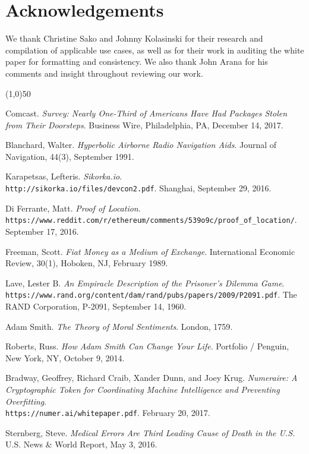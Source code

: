 \documentclass{article}
\begin{document}
\section {Acknowledgements}

We thank Christine Sako and Johnny Kolasinski for their research and compilation of applicable use cases, as well as for their work in auditing the white paper for formatting and consistency. We also thank John Arana for his comments and insight throughout reviewing our work.

\begin{center}
\line(1,0){50}
\end{center}



\begin{thebibliography}{9}

Comcast.
\textit{Survey: Nearly One-Third of Americans Have Had Packages Stolen from Their Doorsteps}.
Business Wire, Philadelphia, PA, December 14, 2017.

Blanchard, Walter.
\textit{Hyperbolic Airborne Radio Navigation Aids}.
Journal of Navigation, 44(3), September 1991.

Karapetsas, Lefteris.
\textit{Sikorka.io}.
\\\texttt{http://sikorka.io/files/devcon2.pdf}.
Shanghai, September 29, 2016.

Di Ferrante, Matt.
\textit{Proof of Location}.
\\\texttt{https://www.reddit.com/r/ethereum/comments/539o9c/proof\_of\_location/}.
September 17, 2016.

Freeman, Scott.
\textit{Fiat Money as a Medium of Exchange}.
International Economic Review, 30(1), Hoboken, NJ, February 1989.

Lave, Lester B.
\textit{An Empiracle Description of the Prisoner's Dilemma Game}.
\\\texttt{https://www.rand.org/content/dam/rand/pubs/papers/2009/P2091.pdf}.
The RAND Corporation, P-2091, September 14, 1960.

Adam Smith.
\textit{The Theory of Moral Sentiments}. 
London, 1759.

Roberts, Russ. 
\textit{How Adam Smith Can Change Your Life}. 
Portfolio / Penguin, New York, NY, October 9, 2014.
 
Bradway, Geoffrey, Richard Craib, Xander Dunn, and Joey Krug.
\textit{Numeraire: A Cryptographic Token for Coordinating Machine Intelligence and Preventing Overfitting}.
\\\texttt{https://numer.ai/whitepaper.pdf}.
February 20, 2017.
 

Sternberg, Steve.
\textit{Medical Errors Are Third Leading Cause of Death in the U.S.}
U.S. News \& World Report, May 3, 2016.

\end{thebibliography}


\clearpage




\printglossaries

\end{document}
